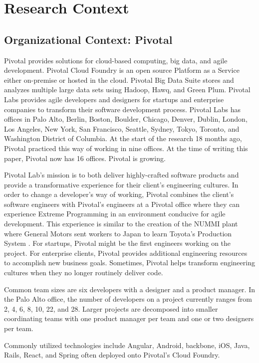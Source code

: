 \section{Research Context}
\label{ResearchContext}
\subsection{Organizational Context: Pivotal}
Pivotal provides solutions for cloud-based computing, big data, and agile development. Pivotal Cloud Foundry is an open source Platform as a Service either on-premise or hosted in the cloud. Pivotal Big Data Suite stores and analyzes multiple large data sets using Hadoop, Hawq, and Green Plum. Pivotal Labs provides agile developers and designers for startups and enterprise companies to transform their software development process. Pivotal Labs has offices in Palo Alto, Berlin, Boston, Boulder, Chicago, Denver, Dublin, London, Los Angeles, New York, San Francisco, Seattle, Sydney, Tokyo, Toronto, and Washington District of Columbia. At the start of the research 18 months ago, Pivotal practiced this way of working in nine offices. At the time of writing this paper, Pivotal now has 16 offices. Pivotal is growing.

Pivotal Lab's mission is to both deliver highly-crafted software products and provide a transformative experience for their client's engineering cultures. In order to change a developer's way of working, Pivotal combines the client's software engineers with Pivotal's engineers at a Pivotal office where they can experience Extreme Programming in an environment conducive for agile development. This experience is similar to the creation of the NUMMI plant where General Motors sent workers to Japan to learn Toyota's Production System \cite{Nummi}. For startups, Pivotal might be the first engineers working on the project. For enterprise clients, Pivotal provides additional engineering resources to accomplish new business goals. Sometimes, Pivotal helps transform engineering cultures when they no longer routinely deliver code.  

Common team sizes are six developers with a designer and a product manager. In the Palo Alto office, the number of developers on a project currently ranges from 2, 4, 6, 8, 10, 22, and 28. Larger projects are decomposed into smaller coordinating teams with one product manager per team and one or two designers per team. 

Commonly utilized technologies include Angular, Android, backbone, iOS, Java, Rails, React, and Spring often deployed onto Pivotal's Cloud Foundry. 

